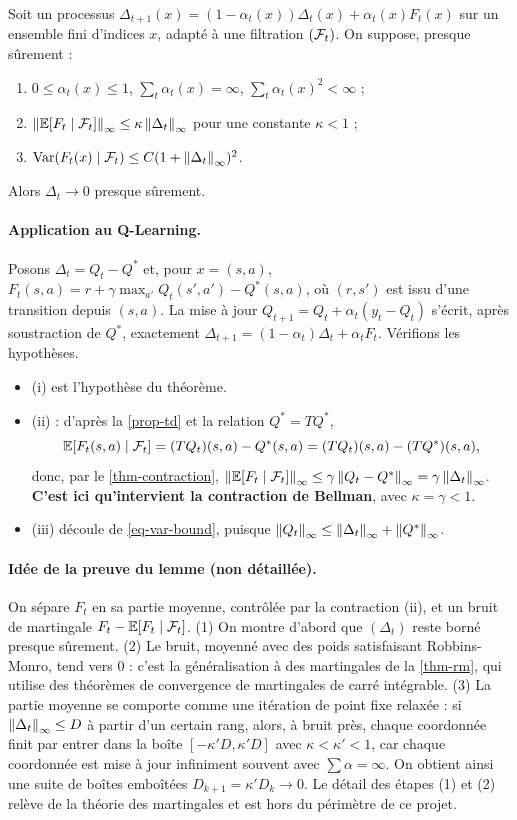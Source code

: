 \begin{lemme}\label{lem-jjs}
Soit un processus $\Delta_{t+1}(x)=(1-\alpha_t(x))\Delta_t(x)+\alpha_t(x)F_t(x)$ sur un ensemble fini d'indices $x$, adapté à une filtration $(\mathcal{F}_t)$. On suppose, presque sûrement :
\begin{enumerate}[label=(\roman*)]
\item $0\le\alpha_t(x)\le1$, $\sum_t\alpha_t(x)=\infty$, $\sum_t\alpha_t(x)^2<\infty$ ;
\item $\left\lVert \mathbb{E}[F_t\mid\mathcal{F}_t] \right\rVert_\infty\le\kappa\left\lVert \Delta_t \right\rVert_\infty$ pour une constante $\kappa<1$ ;
\item $\mathrm{Var}(F_t(x)\mid\mathcal{F}_t)\le C(1+\left\lVert \Delta_t \right\rVert_\infty)^2$.
\end{enumerate}
Alors $\Delta_t\to0$ presque sûrement.
\end{lemme}

\paragraph{Application au Q-Learning.} Posons $\Delta_t=Q_t-Q^*$ et, pour $x=(s,a)$, $F_t(s,a)=r+\gamma\max_{a'}Q_t(s',a')-Q^*(s,a)$, où $(r,s')$ est issu d'une transition depuis $(s,a)$. La mise à jour $Q_{t+1}=Q_t+\alpha_t(y_t-Q_t)$ s'écrit, après soustraction de $Q^*$, exactement $\Delta_{t+1}=(1-\alpha_t)\Delta_t+\alpha_tF_t$. Vérifions les hypothèses.
\begin{itemize}
\item (i) est l'hypothèse du théorème.
\item (ii) : d'après la \cref{prop-td} et la relation $Q^*=TQ^*$,
\[
\mathbb{E}[F_t(s,a)\mid\mathcal{F}_t]=(TQ_t)(s,a)-Q^*(s,a)=(TQ_t)(s,a)-(TQ^*)(s,a),
\]
donc, par le \cref{thm-contraction}, $\left\lVert \mathbb{E}[F_t\mid\mathcal{F}_t] \right\rVert_\infty\le\gamma\left\lVert Q_t-Q^* \right\rVert_\infty=\gamma\left\lVert \Delta_t \right\rVert_\infty$. \textbf{C'est ici qu'intervient la contraction de Bellman}, avec $\kappa=\gamma<1$.
\item (iii) découle de \eqref{eq-var-bound}, puisque $\left\lVert Q_t \right\rVert_\infty\le\left\lVert \Delta_t \right\rVert_\infty+\left\lVert Q^* \right\rVert_\infty$.
\end{itemize}

\paragraph{Idée de la preuve du lemme (non détaillée).} On sépare $F_t$ en sa partie moyenne, contrôlée par la contraction (ii), et un bruit de martingale $F_t-\mathbb{E}[F_t\mid\mathcal{F}_t]$. (1) On montre d'abord que $(\Delta_t)$ reste borné presque sûrement. (2) Le bruit, moyenné avec des poids satisfaisant Robbins-Monro, tend vers $0$ : c'est la généralisation à des martingales de la \cref{thm-rm}, qui utilise des théorèmes de convergence de martingales de carré intégrable. (3) La partie moyenne se comporte comme une itération de point fixe relaxée : si $\left\lVert \Delta_t \right\rVert_\infty\le D$ à partir d'un certain rang, alors, à bruit près, chaque coordonnée finit par entrer dans la boîte $[-\kappa' D,\kappa' D]$ avec $\kappa<\kappa'<1$, car chaque coordonnée est mise à jour infiniment souvent avec $\sum\alpha=\infty$. On obtient ainsi une suite de boîtes emboîtées $D_{k+1}=\kappa' D_k\to0$. Le détail des étapes (1) et (2) relève de la théorie des martingales et est hors du périmètre de ce projet.

